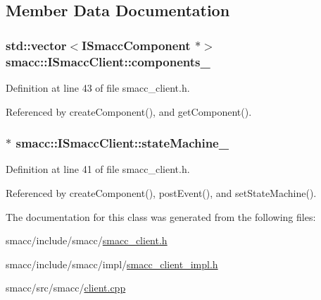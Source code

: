\subsection{Member Data Documentation}
\subsubsection[{\texorpdfstring{components\+\_\+}{components_}}]{\setlength{\rightskip}{0pt plus 5cm}std\+::vector$<${\bf I\+Smacc\+Component} $\ast$$>$ smacc\+::\+I\+Smacc\+Client\+::components\+\_\+\hspace{0.3cm}{\ttfamily [protected]}}\hypertarget{classsmacc_1_1ISmaccClient_ab0b212380d3e16ffbd338034ce54073a}{}\label{classsmacc_1_1ISmaccClient_ab0b212380d3e16ffbd338034ce54073a}


Definition at line 43 of file smacc\+\_\+client.\+h.



Referenced by create\+Component(), and get\+Component().

\subsubsection[{\texorpdfstring{state\+Machine\+\_\+}{stateMachine_}}]{$\ast$ smacc\+::\+I\+Smacc\+Client\+::state\+Machine\+\_\+\hspace{0.3cm}{\ttfamily [protected]}}\hypertarget{classsmacc_1_1ISmaccClient_a926e4f2ae796def63d48dca389a48c47}{}\label{classsmacc_1_1ISmaccClient_a926e4f2ae796def63d48dca389a48c47}


Definition at line 41 of file smacc\+\_\+client.\+h.



Referenced by create\+Component(), post\+Event(), and set\+State\+Machine().



The documentation for this class was generated from the following files\+:\begin{DoxyCompactItemize}
\item 
smacc/include/smacc/\hyperlink{smacc__client_8h}{smacc\+\_\+client.\+h}\item 
smacc/include/smacc/impl/\hyperlink{smacc__client__impl_8h}{smacc\+\_\+client\+\_\+impl.\+h}\item 
smacc/src/smacc/\hyperlink{client_8cpp}{client.\+cpp}\end{DoxyCompactItemize}
